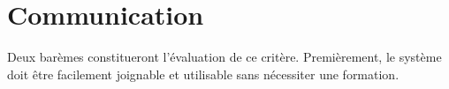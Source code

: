 

\section{Communication}
\label{s:cdc_comm}

Deux barèmes constitueront l’évaluation de ce critère.
Premièrement, le système doit être facilement joignable et utilisable sans nécessiter une formation.


